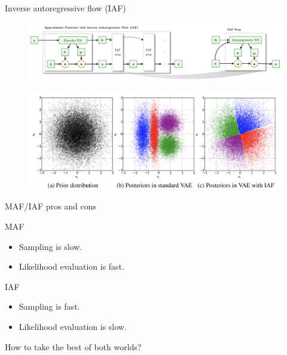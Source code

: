 \begin{frame}{Inverse autoregressive flow (IAF)}
	\begin{figure}
		\includegraphics[width=\linewidth]{figs/iaf2.png}
	\end{figure}
	\begin{figure}
		\includegraphics[width=\linewidth]{figs/iaf1.png}
	\end{figure}

\end{frame}
\begin{frame}{MAF/IAF pros and cons}
	\begin{block}{MAF}
		\begin{itemize}
			\item Sampling is slow.
			\item Likelihood evaluation is fast.
		\end{itemize}
	\end{block}
	\begin{block}{IAF}
		\begin{itemize}
			\item Sampling is fast.
			\item Likelihood evaluation is slow.
		\end{itemize}
	\end{block}
	\vspace{0.3cm}
	How to take the best of both worlds?
\end{frame}
